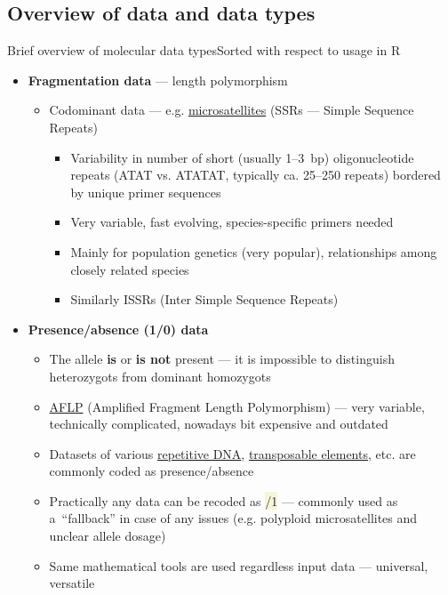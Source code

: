 \documentclass[compress, xelatex, 11pt, xcolor=svgnames, aspectratio=169, url={hyphens, lowtilde}]{beamer}
\renewcommand{\texttt}[1]{\colorbox{Beige}{{\ttfamily #1}}}
\begin{document}
\subsection[Overview]{Overview of data and data types}

\begin{frame}[allowframebreaks]{Brief overview of molecular data types}{Sorted with respect to usage in R}
	\begin{itemize}
		\item \textbf{Fragmentation data} --- length polymorphism
		\begin{itemize}
			\item Codominant data --- e.g. \href{https://en.wikipedia.org/wiki/Microsatellite}{microsatellites} (SSRs --- Simple Sequence Repeats)
			\begin{itemize}
				\item Variability in number of short (usually 1--3~bp) oligonucleotide repeats (ATAT vs. ATATAT, typically ca. 25--250 repeats) bordered by unique primer sequences
				\item Very variable, fast evolving, species-specific primers needed
				\item Mainly for population genetics (very popular), relationships among closely related species
				\item Similarly ISSRs (Inter Simple Sequence Repeats)
			\end{itemize}
		\end{itemize}
		\item \textbf{Presence/absence (1/0) data}
		\begin{itemize}
			\item The allele \textbf{is} or \textbf{is not} present  --- it is impossible to distinguish heterozygots from dominant homozygots
			\item \href{https://en.wikipedia.org/wiki/Amplified_fragment_length_polymorphism}{AFLP} (Amplified Fragment Length Polymorphism) --- very variable, technically complicated, nowadays bit expensive and outdated
			\item Datasets of various \href{https://en.wikipedia.org/wiki/Repeated_sequence_(DNA)}{repetitive DNA}, \href{https://en.wikipedia.org/wiki/Transposable_element}{transposable elements}, etc. are commonly coded as presence/absence
			\item Practically any data can be recoded as \texttt{0/1} --- commonly used as a~\enquote{fallback} in case of any issues (e.g. polyploid microsatellites and unclear allele dosage)
			\item Same mathematical tools are used regardless input data --- universal, versatile

\end{itemize}
\end{itemize}
\end{frame}
\end{document}
